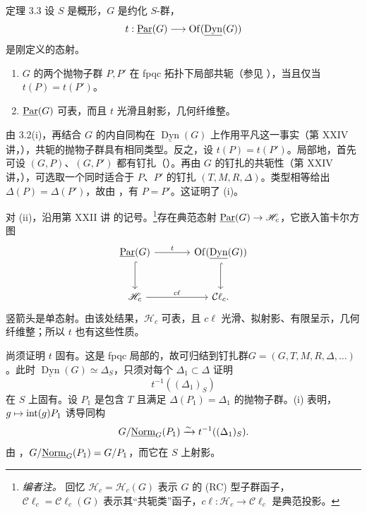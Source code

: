 \begin{sgastatement}{定理 3.3}
设 \(S\) 是概形，\(G\) 是约化 \(S\)-群，
\[
 t:\underline{\operatorname{Par}}(G)\longrightarrow\operatorname{Of}(\underline{\operatorname{Dyn}}(G))
\]
是刚定义的态射。
\begin{enumerate}[label=\textup{(\roman*)}]
\item \(G\) 的两个抛物子群 \(P,P'\) 在 fpqc 拓扑下局部共轭（参见 ），当且仅当 \(t(P)=t(P')\)。
\item{} \(\underline{\operatorname{Par}}(G)\) 可表，而且 \(t\) 光滑且射影，几何纤维整。
\end{enumerate}
\end{sgastatement}

由 3.2(i)，再结合 \(G\) 的内自同构在 \(\underline{\operatorname{Dyn}}(G)\) 上作用平凡这一事实（第 XXIV 讲，），共轭的抛物子群具有相同类型。反之，设 \(t(P)=t(P')\)。局部地，首先可设 \((G,P)\)、\((G,P')\) 都有钉扎（）。再由 \(G\) 的钉扎的共轭性（第 XXIV 讲，），可选取一个同时适合于 \(P\)、\(P'\) 的钉扎 \((T,M,R,\Delta)\)。类型相等给出 \(\Delta(P)=\Delta(P')\)，故由 ，有 \(P=P'\)。这证明了 (i)。

对 (ii)，沿用第 XXII 讲  的记号。\footnote{\emph{编者注。} 回忆 \(\mathscr H_c=\mathscr H_c(G)\) 表示 \(G\) 的 (RC) 型子群函子，\(\mathcal C\ell_c=\mathcal C\ell_c(G)\) 表示其“共轭类”函子，\(c\ell:\mathscr H_c\to\mathcal C\ell_c\) 是典范投影。}存在典范态射 \(\underline{\operatorname{Par}}(G)\to\mathscr H_c\)，它嵌入笛卡尔方图
\[
\begin{tikzcd}[column sep=large,row sep=large]
 \Par(G) \arrow[r,"t"] \arrow[d,hook]
   & \Of(\underline{\operatorname{Dyn}}(G)) \arrow[d,hook]\\
 \mathscr H_c \arrow[r,"c\ell"]
   & \mathcal C\ell_c .
\end{tikzcd}
\]
竖箭头是单态射。由该处结果，\(\mathscr H_c\) 可表，且 \(c\ell\) 光滑、拟射影、有限呈示，几何纤维整；所以 \(t\) 也有这些性质。

尚须证明 \(t\) 固有。这是 fpqc 局部的，故可归结到钉扎群\linebreak \(G=(G,T,M,R,\Delta,\ldots)\)。此时 \(\underline{\operatorname{Dyn}}(G)\simeq\Delta_S\)，只须对每个 \(\Delta_1\subset\Delta\) 证明
\[
 t^{-1}((\Delta_1)_S)
\]
在 \(S\) 上固有。设 \(P_1\) 是包含 \(T\) 且满足 \(\Delta(P_1)=\Delta_1\) 的抛物子群。(i) 表明，\(g\mapsto\operatorname{int}(g)P_1\) 诱导同构
\[
 G/\underline{\operatorname{Norm}}_G(P_1)\xrightarrow{\sim}t^{-1}((\Delta_1)_S).
\]
由 ，\(G/\underline{\operatorname{Norm}}_G(P_1)=G/P_1\)，而它在 \(S\) 上射影。

